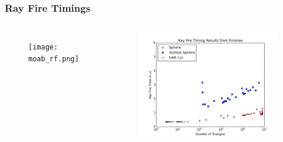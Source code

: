 \documentclass[12pt]{beamer}
\begin{document}
\begin{frame}[c]
\frametitle{Ray Fire Timings}

\begin{columns}
  \begin{figure}
    \centering
    \texttt{[image: moab\_rf.png]}
  \end{figure}
  \begin{figure}
    \centering
    \includegraphics[scale=0.15]{embree_rf.png}
  \end{figure}
\end{columns}
\vfill
\end{frame}
\end{document}

